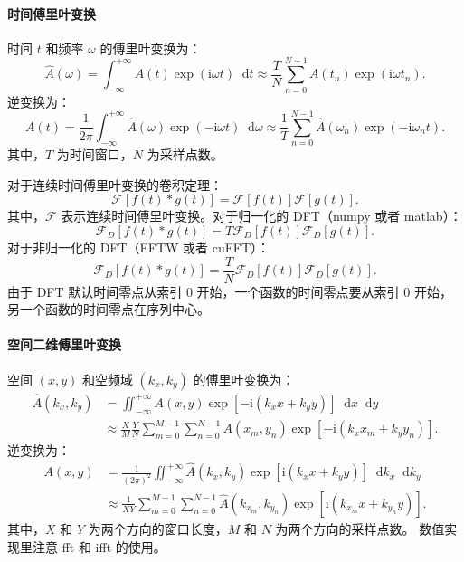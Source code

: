 \documentclass[a4paper,12pt]{ctexart}
\numberwithin{equation}{section}
\newcommand{\dd}{\mathop{}\!\mathrm{d}}
\newcommand{\FT}{\mathcal{F}}
\begin{document}
\paragraph{时间傅里叶变换}
时间 $t$ 和频率 $\omega$ 的傅里叶变换为：
\begin{equation}
  \hat{A}(\omega)=\int_{-\infty}^{+\infty}A(t)\exp(\mathrm{i}\omega t)\dd t
  \approx\frac{T}{N}\sum_{n=0}^{N-1}A(t_n)\exp(\mathrm{i}\omega t_n).
\end{equation}
逆变换为：
\begin{equation}
  A(t)=\frac{1}{2\pi}\int_{-\infty}^{+\infty}\hat{A}(\omega)
  \exp(-\mathrm{i}\omega t)\dd\omega
  \approx\frac{1}{T}\sum_{n=0}^{N-1}\hat{A}(\omega_n)
  \exp(-\mathrm{i}\omega_n t).
\end{equation}
其中，$T$ 为时间窗口，$N$ 为采样点数。

对于连续时间傅里叶变换的卷积定理：
\begin{equation}
  \FT[f(t)*g(t)]=\FT[f(t)]\FT[g(t)].
\end{equation}
其中，$\FT$ 表示连续时间傅里叶变换。对于归一化的 DFT（numpy 或者 matlab）：
\begin{equation}
  \FT_D[f(t)*g(t)]=T\FT_D[f(t)]\FT_D[g(t)].
\end{equation}
对于非归一化的 DFT（FFTW 或者 cuFFT）：
\begin{equation}
  \FT_D[f(t)*g(t)]=\frac{T}{N}\FT_D[f(t)]\FT_D[g(t)].
\end{equation}
由于 DFT 默认时间零点从索引 0 开始，一个函数的时间零点要从索引 0 开始，
另一个函数的时间零点在序列中心。

\paragraph{空间二维傅里叶变换}
空间 $(x,y)$ 和空频域 $(k_x,k_y)$ 的傅里叶变换为：
\begin{equation}
  \begin{aligned}
    \hat{A}(k_x,k_y)
     & =\iint_{-\infty}^{+\infty}A(x,y)
    \exp[-\mathrm{i}(k_xx+k_yy)]\dd x\dd y \\
     & \approx\frac{X}{M}\frac{Y}{N}
    \sum_{m=0}^{M-1}\sum_{n=0}^{N-1}A(x_m,y_n)
    \exp[-\mathrm{i}(k_xx_m+k_yy_n)].
  \end{aligned}
\end{equation}
逆变换为：
\begin{equation}
  \begin{aligned}
    A(x,y)
     & =\frac{1}{(2\pi)^2}\iint_{-\infty}^{+\infty}\hat{A}(k_x,k_y)
    \exp[\mathrm{i}(k_xx+k_yy)]\dd k_x\dd k_y                       \\
     & \approx\frac{1}{XY}\sum_{m=0}^{M-1}\sum_{n=0}^{N-1}
    \hat{A}(k_{x_m},k_{y_n})
    \exp[\mathrm{i}(k_{x_m}x+k_{y_n}y)].
  \end{aligned}
\end{equation}
其中，$X$ 和 $Y$ 为两个方向的窗口长度，$M$ 和 $N$ 为两个方向的采样点数。
数值实现里注意 fft 和 ifft 的使用。
\end{document}
